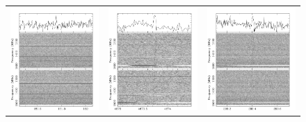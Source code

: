 \documentclass[fleqn,usenatbib]{mnras}
\begin{document}

\begin{figure}
    \begin{center}
    \begin{tabular}{ccc}
    \includegraphics[width=5.5cm]{exhibition/7.10_BJ0021_067D1.sf_181.653.png} & 
    \includegraphics[width=5.5cm]{exhibition/7.21_SMC017_073C1.sf_4673.288.png} & 
    \includegraphics[width=5.5cm]{exhibition/7.49_BJ0018_052A1.sf_209.318875.png}\\

\end{tabular}
\end{center}
\end{figure}
\end{document}
